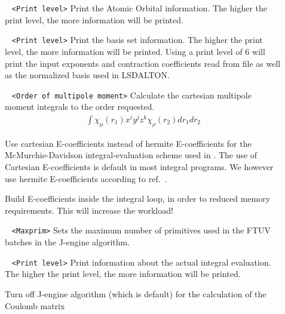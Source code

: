 \begin{description}
\item[] 
\verb| | \newline
\verb|<Print level>|\newline
Print the Atomic Orbital information. The higher the print level, the more information will be printed.
\item[] 
\verb| | \newline
\verb|<Print level>|\newline
Print the basis set information. The higher the print level, the more information will be printed.
Using a print level of 6 will print the input exponents and contraction coefficients read from file as well as the normalized basis used in LSDALTON.  
\item[] 
\verb| | \newline
\verb|<Order of multipole moment>|\newline
Calculate the cartesian multipole moment integrals to the order requested. 
\begin{eqnarray}
\int \chi_{\mu}(r_{1}) x^{i}y^{j}z^{k} \chi_{\rho}(r_{2}) dr_{1}dr_{2}
\end{eqnarray}
\item[] Use cartesian E-coefficients instead of hermite E-coefficients for the McMurchie-Davidson
integral-evaluation scheme \cite{McMurchie1978} used in \lsdalton. The use of Cartesian E-coefficients is 
default in most integral programs. We however use hermite E-coefficients according to ref.~\cite{reine:4771}.
\item[] Build E-coefficients inside the integral loop, in order to reduced memory requirements. 
This will increase the workload! 
\item[] 
\verb| | \newline
\verb|<Maxprim>|\newline
Sets the maximum number of primitives used in the FTUV batches in the J-engine algorithm.
\item[] 
\verb| | \newline
\verb|<Print level>|\newline
Print information about the actual integral evaluation. The higher the print level, the more information will be printed. 
\item[] Turn off J-engine algorithm (which is default) for the calculation of the Coulomb matrix 

\end{description}
